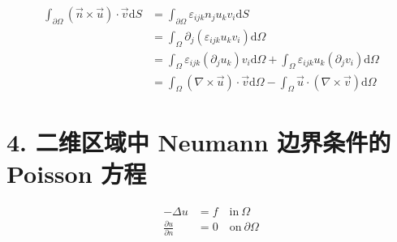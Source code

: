 \documentclass[a4paper]{article}
\begin{document}
\begin{equation}
    \begin{aligned}
        \int_{\partial \Omega}(\vec{n}\times \vec{u}) \cdot \vec{v} \text{d}S
        &=\int_{\partial \Omega}\varepsilon_{ijk}n_j u_k v_i \text{d}S\\
        &=\int_{\Omega}\partial_j(\varepsilon_{ijk}u_k v_i) \text{d}\Omega\\
        &=\int_{\Omega}\varepsilon_{ijk}(\partial_j u_k) v_i \text{d}\Omega
        +\int_{\Omega}\varepsilon_{ijk} u_k (\partial_j v_i) \text{d}\Omega\\
        &=\int_{\Omega}(\nabla \times \vec{u}) \cdot \vec{v} \text{d}\Omega
        -\int_{\Omega}\vec{u} \cdot (\nabla \times \vec{v}) \text{d}\Omega
    \end{aligned}
\end{equation}

\section*{4. 二维区域中 Neumann 边界条件的 Poisson 方程}

\vspace*{-4ex}

\begin{align}
    -\Delta u &= f \quad \text{in} \  \Omega
    \label{Poisson 方程}\\
    \frac{\partial u}{\partial n} &= 0 \quad \text{on} \  \partial \Omega
    \label{Neumann 边界条件}
\end{align}
\end{document}
